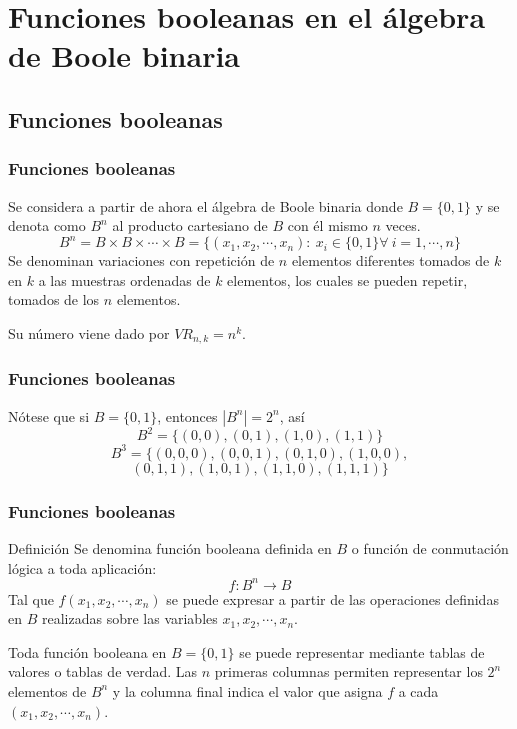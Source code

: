 \documentclass{beamer}
\begin{document}
\section{Funciones booleanas en el \'algebra de Boole binaria}
\subsection{Funciones booleanas}

\begin{frame}
\frametitle{Funciones booleanas}
Se considera a partir de ahora el \'algebra de Boole binaria donde $B=\{0,1\}$ y se denota como $B^n$ al producto cartesiano de $B$ con \'el mismo $n$ veces.
\[B^n = B\times B \times \cdots \times B = \{(x_1,x_2,\cdots,x_n):\ x_i \in \{0,1\}\forall \ i = 1,\cdots, n\}\]
Se denominan variaciones con repetici\'on de $n$ elementos diferentes tomados de $k$ en $k$ a las muestras ordenadas de $k$ elementos, los cuales se pueden repetir,  tomados de los $n$ elementos. 

Su n\'umero viene dado por $VR_{n,k} = n^k$.
\end{frame}

\begin{frame}
\frametitle{Funciones booleanas}
N\'otese que si $B=\{0,1\}$, entonces $|B^n| = 2^n$, as\'i
\[B^2 = \{(0,0), (0,1), (1,0), (1,1)\}\]
\[B^3 = \{(0,0,0), (0,0,1), (0,1,0), (1,0,0),\]\[(0,1,1),(1,0,1),(1,1,0),(1,1,1)\}\]
\end{frame}

\begin{frame}
\frametitle{Funciones booleanas}
\begin{block}{Definici\'on}
Se denomina funci\'on booleana definida en $B$ o funci\'on de conmutaci\'on l\'ogica a toda aplicaci\'on:
\[f:B^n\longrightarrow B\]
Tal que $f(x_1,x_2,\cdots,x_n)$ se puede expresar a partir de las operaciones definidas en $B$ realizadas sobre las variables $x_1,x_2,\cdots,x_n$.
\end{block}
Toda funci\'on booleana en $B=\{0,1\}$ se puede representar mediante tablas de valores o tablas de verdad. Las $n$ primeras columnas permiten representar los $2^n$ elementos de $B^n$ y la columna final indica el valor que asigna $f$ a cada $(x_1,x_2,\cdots,x_n)$. 
\end{frame}
\end{document}
